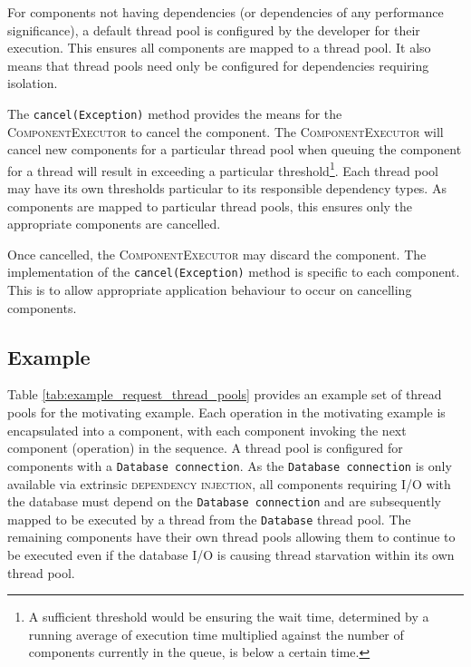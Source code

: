 \documentclass[prodmode]{style/acmlarge}
\begin{document}
For components not having dependencies (or dependencies of any
performance significance), a default thread pool is configured by the developer
for their execution.  This ensures all components are mapped to a
thread pool.  It also means that thread pools need only be configured for
dependencies requiring isolation.

The \texttt{cancel(Exception)} method provides the means for the
\textsc{ComponentExecutor} to cancel the component.  The
\textsc{ComponentExecutor} will cancel new components for a particular thread
pool when queuing the component for a thread will result in exceeding a
particular threshold\footnote{A sufficient threshold would be ensuring the wait
time, determined by a running average of execution time multiplied against the
number of components currently in the queue, is below a certain time.}.  Each
thread pool may have its own thresholds particular to its responsible dependency
types.  As components are mapped to particular thread pools, this ensures only
the appropriate components are cancelled.

Once cancelled, the \textsc{ComponentExecutor} may discard the component.  The
implementation of the \texttt{cancel(Exception)} method is specific to each
component.  This is to allow appropriate application behaviour to occur on
cancelling components.


\subsection{Example}

Table \ref{tab:example_request_thread_pools} provides an example set of thread
pools for the motivating example.  Each operation in the motivating example is
encapsulated into a component, with each component invoking the next component
(operation) in the sequence.  A thread pool is configured for components with a
\texttt{Database connection}.  As the \texttt{Database connection} is only
available via extrinsic \textsc{dependency injection}, all components requiring
I/O with the database must depend on the \texttt{Database connection} and are
subsequently mapped to be executed by a thread from the \texttt{Database} thread
pool.  The remaining components have their own thread pools allowing them to
continue to be executed even if the database I/O is causing thread starvation
within its own thread pool.
\end{document}
